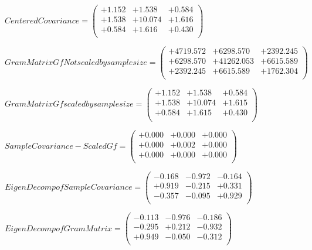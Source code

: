 \documentclass[9pt]{article}
\theoremstyle{plain}
\theoremstyle{definition}
\theoremstyle{remark}
\numberwithin{equation}{section}
\begin{document}
$Centered Covariance = \left(
\begin{array}{
ccc}
+1.152 & +1.538 & +0.584 \\
+1.538 & +10.074 & +1.616 \\
+0.584 & +1.616 & +0.430 \\
\end{array}
\right)$ \newline 

$Gram Matrix Gf Not scaled by sample size = \left(
\begin{array}{
ccc}
+4719.572 & +6298.570 & +2392.245 \\
+6298.570 & +41262.053 & +6615.589 \\
+2392.245 & +6615.589 & +1762.304 \\
\end{array}
\right)$ \newline 

$Gram Matrix Gf  scaled by sample size = \left(
\begin{array}{
ccc}
+1.152 & +1.538 & +0.584 \\
+1.538 & +10.074 & +1.615 \\
+0.584 & +1.615 & +0.430 \\
\end{array}
\right)$ \newline 

$SampleCovariance - Scaled Gf = \left(
\begin{array}{
ccc}
+0.000 & +0.000 & +0.000 \\
+0.000 & +0.002 & +0.000 \\
+0.000 & +0.000 & +0.000 \\
\end{array}
\right)$ \newline 

$EigenDecomp of SampleCovariance = \left(
\begin{array}{
ccc}
-0.168 & -0.972 & -0.164 \\
+0.919 & -0.215 & +0.331 \\
-0.357 & -0.095 & +0.929 \\
\end{array}
\right)$ \newline 

$EigenDecomp of Gram Matrix = \left(
\begin{array}{
ccc}
-0.113 & -0.976 & -0.186 \\
-0.295 & +0.212 & -0.932 \\
+0.949 & -0.050 & -0.312 \\
\end{array}
\right)$ \newline 
\end{document}
